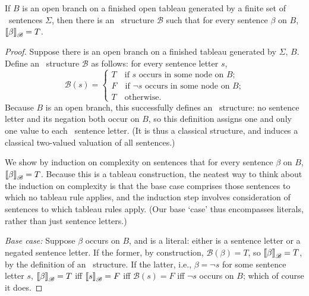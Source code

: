 \begin{lemma}\label{lemm:hin} If $B$ is an open branch on a finished open tableau generated by a finite set of \lone\ sentences $\Sigma$, then there is an \lone\ structure $\mathcal{B}$ such that for every sentence $\beta$ on $B$, $\left\llbracket \beta\right\rrbracket_{\mathscr{B}} = T$.\end{lemma}
\begin{proof}
	
	Suppose there is an open branch on a finished tableau generated by $\Sigma$, $B$. Define an \lone\ structure $\mathscr{B}$ as follows: for every sentence letter $s$, \[\mathscr{B}(s) = \begin{cases}
		T \quad\text{if $s$ occurs in some node on $B$;}\\
		F \quad\text{if $\neg s$ occurs in some node on $B$;}\\
		T \quad\text{otherwise.}
	\end{cases}\] Because $B$ is an open branch, this successfully defines an \lone\ structure: no sentence letter and its negation both occur on $B$, so this definition assigns one and only one value to each \lone\ sentence letter. (It is thus a classical structure, and induces a classical two-valued valuation of all sentences.)
	
We show by induction on complexity on sentences  that  for every sentence $\beta$ on $B$, $\left\llbracket \beta\right\rrbracket_{\mathscr{B}}=T$. Because this is a tableau construction, the neatest way to think about the induction on complexity is that the base case comprises those sentences to which no tableau rule applies, and the induction step involves consideration of sentences to which tableau rules apply. (Our base ‘case’ thus encompasses literals, rather than just sentence letters.) 

\noindent\emph{Base case:} Suppose $\beta$ occurs on $B$, and is a literal: either is a sentence letter or a negated sentence letter. If the former, by construction, $\mathscr{B}(\beta)=T$, so $\left\llbracket \beta\right\rrbracket_{\mathscr{B}}=T$, by the definition of an \lone\ structure. If the latter, i.e., $\beta = \neg s$ for some sentence letter $s$, $\left\llbracket \beta\right\rrbracket_{\mathscr{B}} = T$ iff $\left\llbracket s\right\rrbracket_{\mathscr{B}} = F$ iff $\mathscr{B}(s) = F$ iff $\neg s$ occurs on $B$; which of course it does.


\end{proof}
